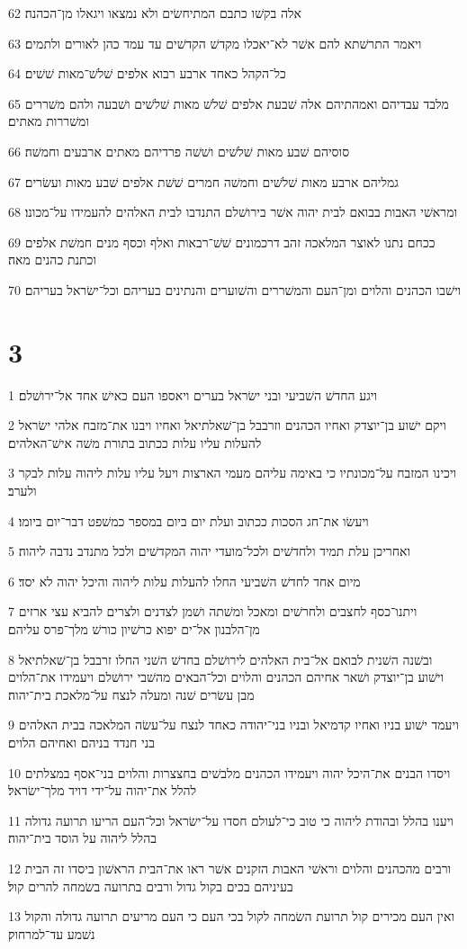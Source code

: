\par 62 אלה בקשׁו כתבם המתיחשׂים ולא נמצאו ויגאלו מן־הכהנה׃
\par 63 ויאמר התרשׁתא להם אשׁר לא־יאכלו מקדשׁ הקדשׁים עד עמד כהן לאורים ולתמים׃
\par 64 כל־הקהל כאחד ארבע רבוא אלפים שׁלשׁ־מאות שׁשׁים׃
\par 65 מלבד עבדיהם ואמהתיהם אלה שׁבעת אלפים שׁלשׁ מאות שׁלשׁים ושׁבעה ולהם משׁררים ומשׁררות מאתים׃
\par 66 סוסיהם שׁבע מאות שׁלשׁים ושׁשׁה פרדיהם מאתים ארבעים וחמשׁה׃
\par 67 גמליהם ארבע מאות שׁלשׁים וחמשׁה חמרים שׁשׁת אלפים שׁבע מאות ועשׂרים׃
\par 68 ומראשׁי האבות בבואם לבית יהוה אשׁר בירושׁלם התנדבו לבית האלהים להעמידו על־מכונו׃
\par 69 ככחם נתנו לאוצר המלאכה זהב דרכמונים שׁשׁ־רבאות ואלף וכסף מנים חמשׁת אלפים וכתנת כהנים מאה׃
\par 70 וישׁבו הכהנים והלוים ומן־העם והמשׁררים והשׁוערים והנתינים בעריהם וכל־ישׂראל בעריהם׃

\chapter{3}

\par 1 ויגע החדשׁ השׁביעי ובני ישׂראל בערים ויאספו העם כאישׁ אחד אל־ירושׁלם׃
\par 2 ויקם ישׁוע בן־יוצדק ואחיו הכהנים וזרבבל בן־שׁאלתיאל ואחיו ויבנו את־מזבח אלהי ישׂראל להעלות עליו עלות ככתוב בתורת משׁה אישׁ־האלהים׃
\par 3 ויכינו המזבח על־מכונתיו כי באימה עליהם מעמי הארצות ויעל עליו עלות ליהוה עלות לבקר ולערב׃
\par 4 ויעשׂו את־חג הסכות ככתוב ועלת יום ביום במספר כמשׁפט דבר־יום ביומו׃
\par 5 ואחריכן עלת תמיד ולחדשׁים ולכל־מועדי יהוה המקדשׁים ולכל מתנדב נדבה ליהוה׃
\par 6 מיום אחד לחדשׁ השׁביעי החלו להעלות עלות ליהוה והיכל יהוה לא יסד׃
\par 7 ויתנו־כסף לחצבים ולחרשׁים ומאכל ומשׁתה ושׁמן לצדנים ולצרים להביא עצי ארזים מן־הלבנון אל־ים יפוא כרשׁיון כורשׁ מלך־פרס עליהם׃
\par 8 ובשׁנה השׁנית לבואם אל־בית האלהים לירושׁלם בחדשׁ השׁני החלו זרבבל בן־שׁאלתיאל וישׁוע בן־יוצדק ושׁאר אחיהם הכהנים והלוים וכל־הבאים מהשׁבי ירושׁלם ויעמידו את־הלוים מבן עשׂרים שׁנה ומעלה לנצח על־מלאכת בית־יהוה׃
\par 9 ויעמד ישׁוע בניו ואחיו קדמיאל ובניו בני־יהודה כאחד לנצח על־עשׂה המלאכה בבית האלהים בני חנדד בניהם ואחיהם הלוים׃
\par 10 ויסדו הבנים את־היכל יהוה ויעמידו הכהנים מלבשׁים בחצצרות והלוים בני־אסף במצלתים להלל את־יהוה על־ידי דויד מלך־ישׂראל׃
\par 11 ויענו בהלל ובהודת ליהוה כי טוב כי־לעולם חסדו על־ישׂראל וכל־העם הריעו תרועה גדולה בהלל ליהוה על הוסד בית־יהוה׃
\par 12 ורבים מהכהנים והלוים וראשׁי האבות הזקנים אשׁר ראו את־הבית הראשׁון ביסדו זה הבית בעיניהם בכים בקול גדול ורבים בתרועה בשׂמחה להרים קול׃
\par 13 ואין העם מכירים קול תרועת השׂמחה לקול בכי העם כי העם מריעים תרועה גדולה והקול נשׁמע עד־למרחוק׃

